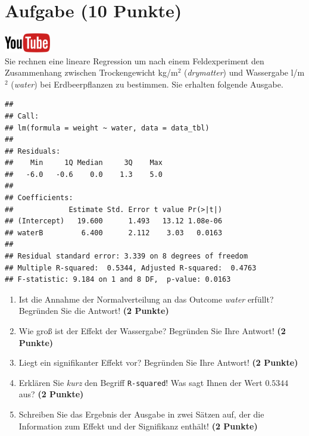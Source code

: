 \documentclass[a4paper, 9pt]{scrartcl}\usepackage[]{graphicx}\usepackage[]{xcolor}
\makeatletter
\newenvironment{kframe}{%
 \def\at@end@of@kframe{}%
 \ifinner\ifhmode%
  \def\at@end@of@kframe{\end{minipage}}%
  \begin{minipage}{\columnwidth}%
 \fi\fi%
 \def\FrameCommand##1{\hskip\@totalleftmargin \hskip-\fboxsep
 \colorbox{shadecolor}{##1}\hskip-\fboxsep
     \hskip-\linewidth \hskip-\@totalleftmargin \hskip\columnwidth}%
 \MakeFramed {\advance\hsize-\width
   \@totalleftmargin\z@ \linewidth\hsize
   \@setminipage}}%
 {\par\unskip\endMakeFramed%
 \at@end@of@kframe}
\newenvironment{knitrout}{}{} %
\makeatother
\begin{document}
\section{Aufgabe \hfill (10 Punkte)}

\hfill\href{https://youtu.be/tNNzcndrpSk}{\includegraphics[width =
  2cm]{img/youtube}}\\[1Ex]

Sie rechnen eine lineare Regression um nach einem Feldexperiment den
Zusammenhang zwischen Trockengewicht kg/m$^2$ (\textit{drymatter}) und
Wassergabe l/m$^2$ (\textit{water}) bei Erdbeerpflanzen zu bestimmen. Sie
erhalten folgende \Rlogo Ausgabe.

\begin{knitrout}
\color{fgcolor}\begin{kframe}
\begin{verbatim}
## 
## Call:
## lm(formula = weight ~ water, data = data_tbl)
## 
## Residuals:
##    Min     1Q Median     3Q    Max 
##   -6.0   -0.6    0.0    1.3    5.0 
## 
## Coefficients:
##             Estimate Std. Error t value Pr(>|t|)
## (Intercept)   19.600      1.493   13.12 1.08e-06
## waterB         6.400      2.112    3.03   0.0163
## 
## Residual standard error: 3.339 on 8 degrees of freedom
## Multiple R-squared:  0.5344,	Adjusted R-squared:  0.4763 
## F-statistic: 9.184 on 1 and 8 DF,  p-value: 0.0163
\end{verbatim}
\end{kframe}
\end{knitrout}


\begin{enumerate}
\item Ist die Annahme der Normalverteilung an das Outcome \textit{water}
  erf{\"u}llt?  Begr{\"u}nden Sie die Antwort! \textbf{(2 Punkte)}
\item Wie gro{\ss} ist der Effekt der Wassergabe?  Begr{\"u}nden Sie Ihre Antwort! \textbf{(2 Punkte)} 
\item Liegt ein signifikanter
  Effekt vor? Begr{\"u}nden Sie Ihre Antwort! \textbf{(2 Punkte)}
\item Erkl{\"a}ren Sie \textit{kurz} den Begriff \texttt{R-squared}!
  Was sagt Ihnen der Wert $0.5344$ aus? \textbf{(2 Punkte)}
\item Schreiben Sie das Ergebnis der \Rlogo Ausgabe in zwei S{\"a}tzen auf, der die
  Information zum Effekt und der Signifikanz enth{\"a}lt! \textbf{(2 Punkte)} 
\end{enumerate}
 
\end{document}
